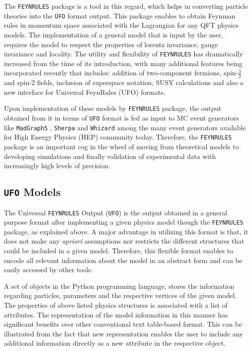 The  \texttt{{\Large F}EYN{\Large R}ULES} package is a tool in this regard, which helps in converting particle theories into the \texttt{UFO} format output. This package enables to obtain Feynman rules in momentum space associated with the Lagrangian for any QFT physics models. The implementation of a general model that is input by the user, requires the model to respect the properties of lorentz invariance, gauge invariance and locality. The utility and flexibility of  \texttt{{\Large F}EYN{\Large R}ULES} has dramatically increased from the time of its introduction, with many additional features being incorporated recently \cite{NewFeynRules} that includes: addition of two-component fermions, spin-$\frac{3}{2}$ and spin-2 fields, inclusion of superspace notation, SUSY calculations and also a new interface for Universal FeynRules (UFO) formats.

Upon implementation of these models by  \texttt{{\Large F}EYN{\Large R}ULES} package, the output obtained from it in terms of \texttt{UFO} format is fed as input to MC event generators like \texttt{MadGraph5}  \cite{MG5}, \texttt{Sherpa} \cite{Gleisberg:2008ta} and \texttt{Whizard} \cite{Reuter:2014ema} among the many event generators available for High Energy Physics (HEP) community today. Therefore, the  \texttt{{\Large F}EYN{\Large R}ULES} package is an important cog in the wheel of moving from theoretical models to developing simulations and finally validation of experimental data with increasingly high levels of precision.

\subsection{\texttt{UFO} Models}\label{UFOModels}

The Universal \texttt{{\Large F}EYN{\Large R}ULES} Output (\texttt{UFO}) \cite{Degrande-UFO} is the output obtained in a general purpose format after implementing a given physics model though the \texttt{{\Large F}EYN{\Large R}ULES} package, as explained above. A major advantage in utilizing this format is that, it does not make any \textit{apriori} assumptions nor restricts the different structures that could be included in a given model. Therefore, this flexible format enables to encode all relevant information about the model in an abstract form and can be easily accessed by other tools.

A set of objects in the Python \cite{Python} programming language, stores the information regarding particles, parameters and the respective vertices of the given model. The properties of above listed physics structures is associated with a list of attributes. The representation of the model information in this manner has significant benefits over other conventional text table-based format. This can be illustrated from the fact that new representation enables the user to include any additional information directly as a new attribute in the respective object. 

